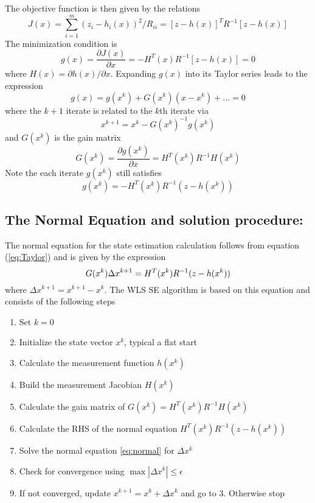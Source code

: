 \documentclass[12pt]{article}
\begin{document}
The objective function is then given by the relations
\begin{equation}\label{eq:JX}
J(x)=\sum_{i=1}^{m}(z_i-h_i(x))^2/R_{ii} = [z-h(x)]^TR^{-1}[z-h(x)] 
\end{equation} 
The minimization condition is
\begin{equation}\label{eq:gx}
g(x)=\frac{\partial J(x)}{\partial x} = -H^T(x)R^{-1}[z-h(x)] = 0 
\end{equation} 
where $H(x)=\partial h(x)/\partial x$. Expanding $g(x)$ into its Taylor series
leads to the expression
\begin{equation}\label{eq:Taylor}
g(x)= g(x^k) + G(x^k)(x-x^k) + ... = 0
\end{equation} 
where the $k+1$ iterate is related to the $k$th iterate via
\[
x^{k+1} = x^k - G(x^k)^{-1}g(x^k)
\]
and $G(x^k)$ is the gain matrix
\[
G(x^k) = \frac{\partial g(x^k)}{\partial x} = H^T(x^k)R^{-1}H(x^k)
\]
Note the each iterate $g(x^k)$ still satisfies
\[
g(x^k) = -H^T(x^k)R^{-1}(z-h(x^k))
\]

\subsection*{The Normal Equation and solution procedure:}
The normal equation for the state estimation calculation follows from
equation (\ref{eq:Taylor}) and is given by the expression
\begin{equation}\label{eq:normal}
G(x^k)\Delta x^{k+1} = H^T(x^k)R^{-1}(z-h(x^k)) \\*
\end{equation} 
where $\Delta x^{k+1} = x^{k+1}-x^k$. The WLS SE algorithm is based on this
equation and consists of the following steps
\begin{enumerate}
\item Set $k=0$
\item Initialize the state vector $x^{k}$, typical a flat start
\item Calculate the measurement function $h(x^k)$
\item Build the measurement Jacobian $H(x^k)$
\item Calculate the gain matrix of $G(x^k)= H^T(x^k)R^{-1}H(x^k)$
\item Calculate the RHS of the normal equation $H^T(x^k)R^{-1}(z-h(x^k))$
\item Solve the normal equation \ref{eq:normal} for $\Delta x^k$
\item Check for convergence using $\max \left |  \Delta x^k \right |\le \epsilon $
\item If not converged, update $x^{k+1} = x^k+\Delta x^k$ and go to 3. Otherwise
stop
\end{enumerate}
\end{document}
